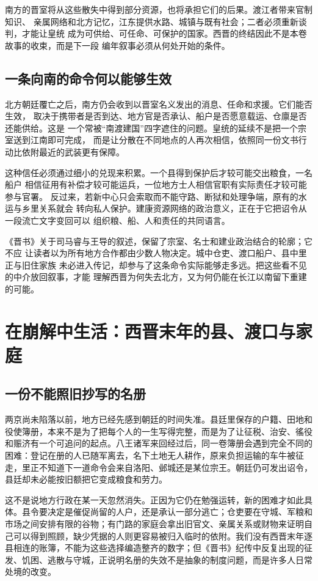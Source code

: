 南方的晋室将从这些散失中得到部分资源，也将承担它们的后果。渡江者带来官制知识、
亲属网络和北方记忆，江东提供水路、城镇与既有社会；二者必须重新谈判，才能让皇统
成为可供给、可任命、可保护的国家。西晋的终结因此不是本卷故事的收束，而是下一段
编年叙事必须从何处开始的条件。

\subsection{一条向南的命令何以能够生效}

北方朝廷覆亡之后，南方仍会收到以晋室名义发出的消息、任命和求援。它们能否生效，
取决于携带者是否到达、地方官是否承认、船户是否愿意载运、仓廪是否还能供给。这是
一个常被“南渡建国”四字遮住的问题。皇统的延续不是把一个宗室送到江南即可完成，
而是让分散在不同地点的人再次相信，依照同一份文书行动比依附最近的武装更有保障。

这种信任必须通过细小的兑现来积累。一个县得到保护后才较可能交出粮食，一名船户
相信征用有补偿才较可能运兵，一位地方士人相信官职有实际责任才较可能参与官署。
反过来，若新中心只会索取而不能守路、断狱和处理争端，原有的水运与乡里关系就会
转向私人保护。建康资源网络的政治意义，正在于它把诏令从一段流亡文字变回可以
组织粮、船、人和责任的共同语言。

《晋书》关于司马睿与王导的叙述，保留了宗室、名士和建业政治结合的轮廓；它不应
让读者以为所有地方合作都由少数人物决定。城中仓吏、渡口船户、县中里正与旧住家族
未必进入传记，却参与了这条命令实际能够走多远。把这些看不见的中介放回叙事，才能
理解西晋为何失去北方，又为何仍能在长江以南留下重建的可能。

\section{在崩解中生活：西晋末年的县、渡口与家庭}

\subsection{一份不能照旧抄写的名册}

两京尚未陷落以前，地方已经先感到朝廷的时间失准。县廷里保存的户籍、田地和役使簿册，本来不是为了把每个人的一生写得完整，而是为了让征税、治安、徭役和赈济有一个可追问的起点。八王诸军来回经过后，同一卷簿册会遇到完全不同的困难：登记在册的人已随军离去，名下土地无人耕作，原来负担运输的车牛被征走，里正不知道下一道命令会来自洛阳、邺城还是某位宗王。朝廷仍可发出诏令，县廷却未必能按旧额把它变成粮食和劳力。

这不是说地方行政在某一天忽然消失。正因为它仍在勉强运转，新的困难才如此具体。县令要决定是催促尚留的人户，还是承认一部分逃亡；仓吏要在守城、军粮和市场之间安排有限的谷物；有门路的家庭会拿出旧官文、亲属关系或财物来证明自己可以得到照顾，缺少凭据的人则更容易被归入临时的依附。我们没有西晋末年逐县相连的账簿，不能为这些选择编造整齐的数字；但《晋书》纪传中反复出现的征发、饥困、逃散与守城，正说明名册的失效不是抽象的制度问题，而是许多人日常处境的改变。

